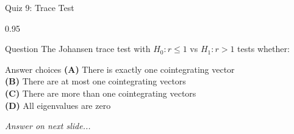 \documentclass[9pt, aspectratio=169, t]{beamer}
\begin{document}
\begin{frame}{Quiz 9: Trace Test}
    \begin{cminipage}{0.95\textwidth}
    \begin{alertblock}{Question}
        The Johansen trace test with $H_0: r \leq 1$ vs $H_1: r > 1$ tests whether:
    \end{alertblock}

    \vspace{0.4cm}

    \begin{block}{Answer choices}
        \textcolor{MainBlue}{\textbf{(A)}} There is exactly one cointegrating vector\\[3pt]
        \textcolor{MainBlue}{\textbf{(B)}} There are at most one cointegrating vectors\\[3pt]
        \textcolor{MainBlue}{\textbf{(C)}} There are more than one cointegrating vectors\\[3pt]
        \textcolor{MainBlue}{\textbf{(D)}} All eigenvalues are zero
    \end{block}

    \vspace{0.5cm}

    \begin{center}
        \textit{Answer on next slide...}
    \end{center}
    \end{cminipage}
\end{frame}
\end{document}
